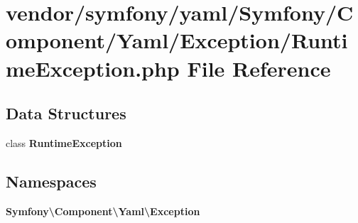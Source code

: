 \section{vendor/symfony/yaml/\+Symfony/\+Component/\+Yaml/\+Exception/\+Runtime\+Exception.php File Reference}
\label{symfony_2yaml_2_symfony_2_component_2_yaml_2_exception_2_runtime_exception_8php}
\subsection*{Data Structures}
\begin{DoxyCompactItemize}
\item 
class {\bf Runtime\+Exception}
\end{DoxyCompactItemize}
\subsection*{Namespaces}
\begin{DoxyCompactItemize}
\item 
 {\bf Symfony\textbackslash{}\+Component\textbackslash{}\+Yaml\textbackslash{}\+Exception}
\end{DoxyCompactItemize}
